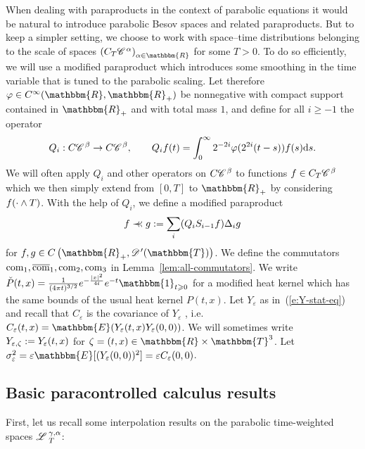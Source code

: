 \begin{appendices}
When dealing with paraproducts in the context of parabolic equations it would
be natural to introduce parabolic Besov spaces and related paraproducts. But
to keep a simpler setting, we choose to work with space--time distributions
belonging to the scale of spaces $\left( C_T \CC^{\alpha} \right)_{\alpha \in
\mathbbm{R}}$ for some $T > 0$. To do so efficiently, we will use a modified
paraproduct which introduces some smoothing in the time variable that is tuned
to the parabolic scaling. Let therefore $\varphi \in C^{\infty} (\mathbbm{R},
\mathbbm{R}_+)$ be nonnegative with compact support contained in
$\mathbbm{R}_+$ and with total mass $1$, and define for all $i \geqslant - 1$
the operator
\[ Q_i : C \mathscr{C} \hspace{.1em}^{\beta} \rightarrow C \mathscr{C} \hspace{.1em}^{\beta}, \qquad Q_i f (t) =
   \int_0^{\infty} 2^{- 2 i} \varphi (2^{2 i} (t - s)) f (s) \mathrm{d} s. \]
We will often apply $Q_i$ and other operators on $C \mathscr{C} \hspace{.1em}^{\beta}$ to functions
$f \in C_T \mathscr{C} \hspace{.1em}^{\beta}$ which we then simply extend from $[0, T]$ to
$\mathbbm{R}_+$ by considering $f (\cdot \wedge T)$. With the help of $Q_i$,
we define a modified paraproduct
\[ f \prec\!\!\!\prec g := \sum_i (Q_i S_{i - 1} f) \Delta_i g \]
for $f, g \in C \left( \mathbbm{R}_+, \CD' (\mathbbm{T}) \right)$. We define
the commutators $\operatorname{com}_1, \overline{\operatorname{com}}_1, \operatorname{com}_2,
\operatorname{com}_3$ in Lemma~\ref{lem:all-commutators}. We write $\check{P} (t, x) =
\frac{1}{(4 \mathpi t)^{3 / 2}} e^{- \frac{| x |^2}{4 t}} e^{- t} 
\mathbbm{1}_{t \geqslant 0}$ for a modified heat kernel which has the same
bounds of the usual heat kernel $P (t, x)$. Let $Y_{\varepsilon}$ as
in~(\ref{e:Y-stat-eq}) and recall that $C_{\varepsilon}$ is the covariance of
$Y_{\varepsilon}$ , i.e. $C_{\varepsilon} (t, x) =\mathbbm{E} (Y_{\varepsilon}
(t, x) Y_{\varepsilon} (0, 0))$. We will sometimes write $Y_{\varepsilon,
\zeta} := Y_{\varepsilon} (t, x)$ for $\zeta = (t, x) \in \mathbbm{R}
\times \mathbbm{T}^3$. Let $\sigma_{\varepsilon}^2 = \varepsilon \mathbbm{E} [
(Y_{\varepsilon} (0, 0))^2] = \varepsilon C_{\varepsilon} (0, 0)$.

\subsection{Basic paracontrolled calculus
results\label{sec:schauder}{\hspace{3em}} \label{sec:bony} }

First, let us recall some interpolation results on the parabolic time-weighted
spaces $\mathscr{L} \hspace{.2em}^{\gamma, \alpha}_T$:


\end{appendices}
